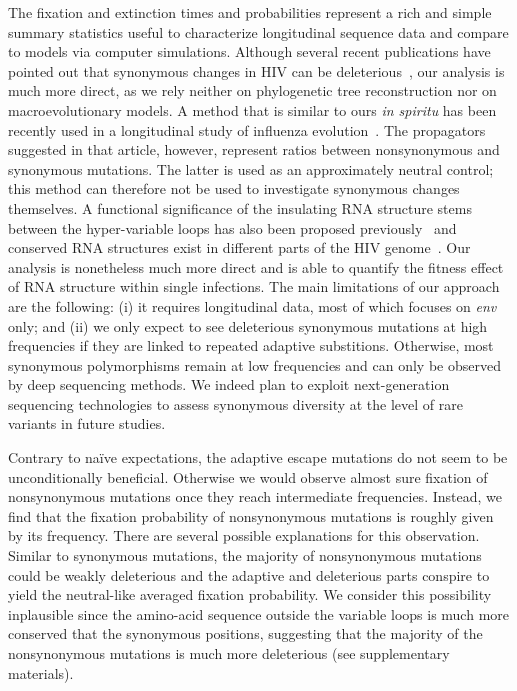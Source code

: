 \documentclass[rmp, twocolumn]{revtex4}
\newcommand{\env}{\textit{env}}
\begin{document}
The fixation and extinction times and probabilities represent a rich and simple
summary statistics useful to characterize longitudinal sequence data and compare
to models via computer simulations. Although several recent publications have
pointed out that synonymous changes in HIV can be
deleterious~\citep{lemey_synonymous_2007, ngandu_extensive_2008}, our analysis
is much more direct, as we rely neither on phylogenetic tree reconstruction nor
on macroevolutionary models. A method that is similar to ours {\it in spiritu}
has been recently used in a longitudinal study of influenza
evolution~\citep{strelkowa_clonal_2012}. The propagators suggested in that
article, however, represent ratios between nonsynonymous and synonymous
mutations.  The latter is used as an approximately neutral control; this method
can therefore not be used to investigate synonymous changes themselves. A
functional significance of the insulating RNA structure stems between the
hyper-variable loops has also been proposed
previously~\citep{watts_architecture_2009, sanjuan_interplay_2011} and conserved
RNA structures exist in different parts of the HIV
genome~\citep{ngandu_extensive_2008}. Our analysis is nonetheless much more
direct and is able to quantify the fitness effect of RNA structure within single
infections. The main limitations of our approach are the following: (i) it
requires longitudinal data, most of which focuses on \env{} only; and (ii) we
only expect to see deleterious synonymous mutations at high frequencies if they
are linked to repeated adaptive substitions. Otherwise, most synonymous
polymorphisms remain at low frequencies and can only be observed by deep
sequencing methods. We indeed plan to exploit next-generation sequencing
technologies to assess synonymous diversity at the level of rare variants in
future studies.

Contrary to na\"ive expectations, the adaptive escape mutations do not seem to be
unconditionally beneficial. Otherwise we would observe almost sure fixation of
nonsynonymous mutations once they reach intermediate frequencies. Instead, we
find that the fixation probability of nonsynonymous mutations is roughly given
by its frequency. There are several possible explanations for this observation. 
Similar to synonymous mutations, the majority of nonsynonymous mutations could
be weakly deleterious and the adaptive and deleterious parts conspire to yield
the neutral-like averaged fixation probability. We consider this possibility
inplausible since the amino-acid sequence outside the variable loops is much
more conserved that the synonymous positions, suggesting that the majority of
the nonsynonymous mutations is much more deleterious (see supplementary
materials). 
\end{document}
